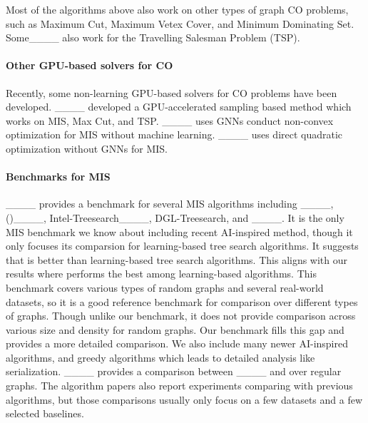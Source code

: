 Most of the algorithms above also work on other types of graph CO problems, such as Maximum Cut, Maximum Vetex Cover, and Minimum Dominating Set. Some____ also work for the Travelling Salesman Problem (TSP).

\paragraph{Other GPU-based solvers for CO}
Recently, some non-learning GPU-based solvers for CO problems have been developed. ____ developed a GPU-accelerated sampling based method which works on MIS, Max Cut, and TSP. ____ uses GNNs conduct non-convex optimization for MIS without machine learning. ____ uses direct quadratic optimization without GNNs for MIS.

\paragraph{Benchmarks for MIS}
____ provides a benchmark for several MIS algorithms including \gurobi____, \kamis (\redumis)____, Intel-Treesearch____, DGL-Treesearch, and \lwd____. It is the only MIS benchmark we know about including recent AI-inspired method, though it only focuses its comparsion for learning-based tree search algorithms. It suggests that \lwd is better than learning-based tree search algorithms. This aligns with our results where \lwd performs the best among learning-based algorithms. This benchmark covers various types of random graphs and several real-world datasets, so it is a good reference benchmark for comparison over different types of graphs. Though unlike our benchmark, it does not provide comparison across various size and density for random graphs. Our benchmark fills this gap and provides a more detailed comparison. We also include many newer AI-inspired algorithms, and greedy algorithms which leads to detailed analysis like serialization.
____ provides a comparison between ____ and \deggreedy over regular graphs. The algorithm papers also report experiments comparing with previous algorithms, but those comparisons usually only focus on a few datasets and a few selected baselines.

